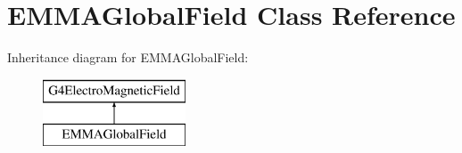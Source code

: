 \hypertarget{classEMMAGlobalField}{\section{E\-M\-M\-A\-Global\-Field Class Reference}
\label{classEMMAGlobalField}
}
Inheritance diagram for E\-M\-M\-A\-Global\-Field\-:\begin{figure}[H]
\begin{center}
\leavevmode
\includegraphics[height=2.000000cm]{classEMMAGlobalField}
\end{center}
\end{figure}
